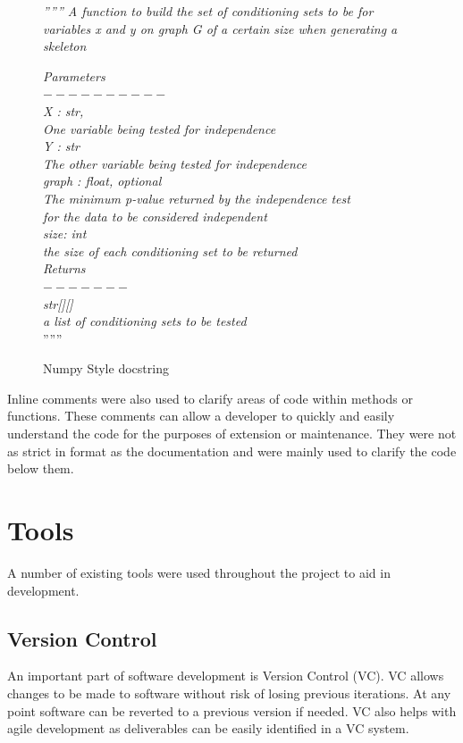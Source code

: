 \documentclass{UoYCSproject}
\begin{document}
\begin{figure}
\textit{ '''''' A  function to build the set of conditioning sets to be for variables x and y
	on graph G of a certain size when generating a skeleton}

\textit{Parameters\\
	$ 	---------- $\\
	X : str, \\
	One variable being tested for independence\\ 
	Y : str\\
	The other variable being tested for independence\\
	graph : float, optional\\
	The minimum p-value returned by the independence test\\
	for the data to be considered independent\\
	size: int\\
	the size of each conditioning set to be returned\\
	Returns\\
	$ ------- $\\
	str[][]\\
	a list of conditioning sets to be tested\\}
''''''\\
\caption{Numpy Style docstring} 
\end{figure}

Inline comments were also used to clarify areas of code within methods or functions. These comments can allow a developer to quickly and easily understand the code for the purposes of extension or maintenance. They were not as strict in format as the documentation and were mainly used to clarify the code below them.

\section{Tools}
A number of existing tools were used throughout the project to aid in development. 

\subsection{Version Control}
An important part of software development is Version Control (VC). VC allows changes to be made to software without risk of losing previous iterations. At any point software can be reverted to a previous version if needed. VC also helps with agile development as deliverables can be easily identified in a VC system.
\end{document}
